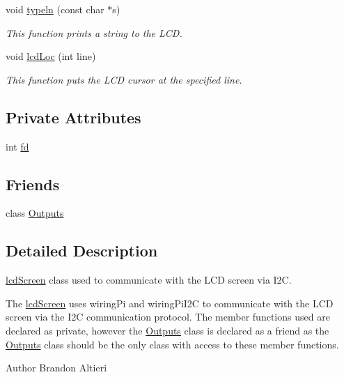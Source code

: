 \begin{DoxyCompactItemize}
void \hyperlink{classlcdScreen_a58dd837a0783c439a50d11df6fc19d43}{typeln} (const char $\ast$s)
\begin{DoxyCompactList}\small\item\em This function prints a string to the L\+CD. \end{DoxyCompactList}\item 
void \hyperlink{classlcdScreen_acb273429c19f2f18a42945bf1b69af28}{lcd\+Loc} (int line)
\begin{DoxyCompactList}\small\item\em This function puts the L\+CD cursor at the specified line. \end{DoxyCompactList}\end{DoxyCompactItemize}
\subsection*{Private Attributes}
\begin{DoxyCompactItemize}
\item 
int \hyperlink{classlcdScreen_a1810308c22efd469be71020079c05d2c}{fd}
\end{DoxyCompactItemize}
\subsection*{Friends}
\begin{DoxyCompactItemize}
\item 
class \hyperlink{classlcdScreen_af99d17c01d4ce8459247f8043b2de102}{Outputs}
\end{DoxyCompactItemize}


\subsection{Detailed Description}
\hyperlink{classlcdScreen}{lcd\+Screen} class used to communicate with the L\+CD screen via I2C. 

The \hyperlink{classlcdScreen}{lcd\+Screen} uses wiring\+Pi and wiring\+Pi\+I2C to communicate with the L\+CD screen via the I2C communication protocol. The member functions used are declared as private, however the \hyperlink{classOutputs}{Outputs} class is declared as a friend as the \hyperlink{classOutputs}{Outputs} class should be the only class with access to these member functions.

\begin{DoxyAuthor}{Author}
Brandon Altieri 
\end{DoxyAuthor}


